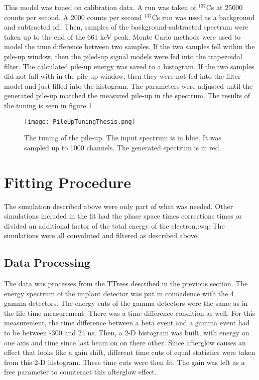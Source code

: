 This model was tuned on calibration data. 
A run was taken of $^{137}$Cs at 25000 counts per second.
A 2000 counts per second $^{137}$Cs run was used as a background and subtracted off.
Then, samples of the background-subtracted spectrum were taken up to the end of the 661 keV peak.
Monte Carlo methods were used to model the time difference between two samples.
If the two samples fell within the pile-up window, then the piled-up signal models were fed into the trapezoidal filter.
The calculated pile-up energy was saved to a histogram.
If the two samples did not fall with in the pile-up window, then they were not fed into the filter model and just filled into the histogram.
The parameters were adjusted until the generated pile-up matched the measured pile-up in the spectrum.
The results of the tuning is seen in figure \ref{fig:pileuptune}

\begin{figure}[!htb]
	\centerline{\texttt{[image: PileUpTuningThesis.png]}}
	\caption{The tuning of the pile-up.
		 The input spectrum is in blue.
		 It was sampled up to 1000 channels.
		 The generated spectrum is in red.}
	\label{fig:pileuptune}
\end{figure}

\section{Fitting Procedure}
The simulation described above were only part of what was needed.
Other simulations included in the fit had the phase space times corrections times or divided an additional factor of the total energy of the electron.:wq:
The simulations were all convoluted and filtered as described above.

\subsection{Data Processing}
The data was processes from the TTrees described in the previous section.
The energy spectrum of the implant detector was put in coincidence with the 4 gamma detectors.
The energy cuts of the gamma detectors were the same as in the life-time measurement.
There was a time difference condition as well.
For this measurement, the time difference between a beta event and a gamma event had to be between -300 and 24 ns.
Then, a 2-D histogram was built, with energy on one axis and time since last beam on on there other.
Since afterglow causes an effect that looks like a gain shift, different time cuts of equal statistics were taken from this 2-D histogram. 
These time cuts were then fit. 
The gain was left as a free parameter to counteract this afterglow effect.

